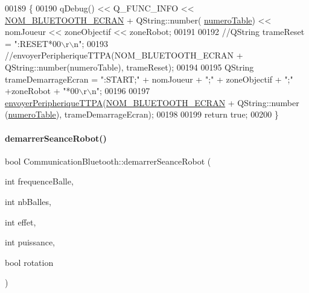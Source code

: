 \begin{DoxyCode}
00189 \{
00190     qDebug() << Q\_FUNC\_INFO << \hyperlink{terminal-_t_t_p_a_2communicationbluetooth_8h_a2bd8beaaf0c4b59979a3f78d4c134ec8}{NOM\_BLUETOOTH\_ECRAN} + QString::number(
      \hyperlink{class_communication_bluetooth_a9428f8261f0cc055e9c6fed9a61cb595}{numeroTable}) << nomJoueur << zoneObjectif << zoneRobot;
00191 
00192     \textcolor{comment}{//QString trameReset = ":RESET*00\(\backslash\)r\(\backslash\)n";}
00193     \textcolor{comment}{//envoyerPeripheriqueTTPA(NOM\_BLUETOOTH\_ECRAN + QString::number(numeroTable), trameReset);}
00194 
00195     QString trameDemarrageEcran = \textcolor{stringliteral}{":START;"} + nomJoueur + \textcolor{stringliteral}{";"} + zoneObjectif + \textcolor{stringliteral}{";"} +zoneRobot + \textcolor{stringliteral}{"*00\(\backslash\)r\(\backslash\)n"};
00196 
00197     \hyperlink{class_communication_bluetooth_a73d95b841bf64a4463760435a41fc219}{envoyerPeripheriqueTTPA}(\hyperlink{terminal-_t_t_p_a_2communicationbluetooth_8h_a2bd8beaaf0c4b59979a3f78d4c134ec8}{NOM\_BLUETOOTH\_ECRAN} + QString::number
      (\hyperlink{class_communication_bluetooth_a9428f8261f0cc055e9c6fed9a61cb595}{numeroTable}), trameDemarrageEcran);
00198 
00199     \textcolor{keywordflow}{return} \textcolor{keyword}{true};
00200 \}
\end{DoxyCode}
\mbox{\label{class_communication_bluetooth_a02e74da6910804557f31e81f26201f89}} 
\paragraph{\texorpdfstring{demarrer\+Seance\+Robot()}{demarrerSeanceRobot()}}
{\footnotesize\ttfamily bool Communication\+Bluetooth\+::demarrer\+Seance\+Robot (\begin{DoxyParamCaption}\item[{int}]{frequence\+Balle,  }\item[{int}]{nb\+Balles,  }\item[{int}]{effet,  }\item[{int}]{puissance,  }\item[{bool}]{rotation }\end{DoxyParamCaption})}



